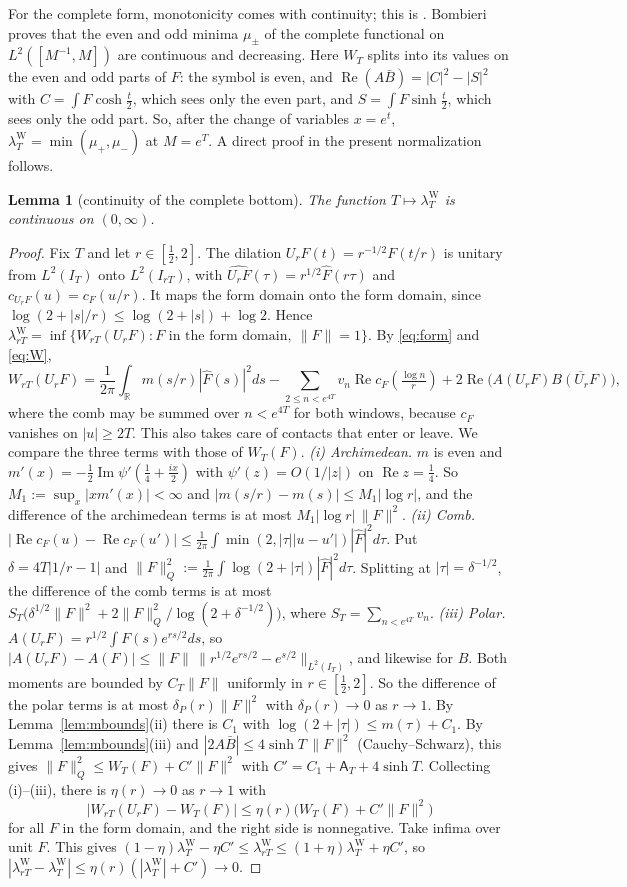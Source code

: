 \documentclass[11pt]{amsart}
\newtheorem{lemma}[theorem]{Lemma}
\theoremstyle{definition}
\theoremstyle{remark}
\newcommand{\R}{\mathbb R}
\newcommand{\Rel}{\operatorname{Re}}
\newcommand{\Iml}{\operatorname{Im}}
\newcommand{\IT}{I_T}
\newcommand{\lamW}{\lambda^{\mathrm W}_T}
\newcommand{\Fh}{\widehat F}
\newcommand{\cF}{c_F}
\newcommand{\Aconst}{\mathsf A_T}
\begin{document}
For the complete form, monotonicity comes with continuity; this is \cite[Thm.~5]{Bombieri2000}.
Bombieri proves that the even and odd minima $\mu_\pm$ of the complete functional
on $L^2([M^{-1},M])$ are continuous and decreasing. Here $W_T$ splits into its values on the even and
odd parts of $F$: the symbol is even, and $\Rel(A\bar B)=|C|^2-|S|^2$ with $C=\int F\cosh\frac t2$, which
sees only the even part, and $S=\int F\sinh\frac t2$, which sees only the odd part. So, after the change of
variables $x=e^t$, $\lamW=\min(\mu_+,\mu_-)$ at $M=e^T$. A direct proof in the present normalization follows.

\begin{lemma}[continuity of the complete bottom]\label{lem:contT}
The function $T\mapsto\lamW$ is continuous on $(0,\infty)$.
\end{lemma}
\begin{proof}
Fix $T$ and let $r\in[\frac12,2]$. The dilation $U_rF(t)=r^{-1/2}F(t/r)$ is unitary from $L^2(\IT)$ onto
$L^2(I_{rT})$, with $\widehat{U_rF}(\tau)=r^{1/2}\Fh(r\tau)$ and $c_{U_rF}(u)=\cF(u/r)$. It maps the form
domain onto the form domain, since $\log(2+|s|/r)\le\log(2+|s|)+\log2$. Hence
$\lambda^{\mathrm W}_{rT}=\inf\{W_{rT}(U_rF):F\text{ in the form domain},\ \|F\|=1\}$. By \eqref{eq:form}
and \eqref{eq:W},
\[
W_{rT}(U_rF)=\frac1{2\pi}\int_\R m(s/r)|\Fh(s)|^2ds-\sum_{2\le n<e^{4T}}v_n\Rel\cF(\tfrac{\log n}r)
+2\Rel\big(A(U_rF)\overline{B(U_rF)}\big),
\]
where the comb may be summed over $n<e^{4T}$ for both windows, because $\cF$ vanishes on $|u|\ge2T$. This
also takes care of contacts that enter or leave. We compare the three terms with those of $W_T(F)$.
\emph{(i) Archimedean.} $m$ is even and $m'(x)=-\frac12\Iml\psi'(\frac14+\frac{ix}2)$ with
$\psi'(z)=O(1/|z|)$ on $\Rel z=\frac14$. So $M_1:=\sup_x|xm'(x)|<\infty$ and
$|m(s/r)-m(s)|\le M_1|\log r|$, and the difference of the archimedean terms is at most
$M_1|\log r|\,\|F\|^2$.
\emph{(ii) Comb.} $|\Rel\cF(u)-\Rel\cF(u')|\le\frac1{2\pi}\int\min(2,|\tau||u-u'|)|\Fh|^2d\tau$. Put
$\delta=4T|1/r-1|$ and $\|F\|_Q^2:=\frac1{2\pi}\int\log(2+|\tau|)|\Fh|^2d\tau$. Splitting at
$|\tau|=\delta^{-1/2}$, the difference of the comb terms is at most
$S_T\big(\delta^{1/2}\|F\|^2+2\|F\|_Q^2/\log(2+\delta^{-1/2})\big)$, where $S_T=\sum_{n<e^{4T}}v_n$.
\emph{(iii) Polar.} $A(U_rF)=r^{1/2}\int F(s)e^{rs/2}ds$, so
$|A(U_rF)-A(F)|\le\|F\|\,\|r^{1/2}e^{rs/2}-e^{s/2}\|_{L^2(\IT)}$, and likewise for $B$. Both moments are
bounded by $C_T\|F\|$ uniformly in $r\in[\frac12,2]$. So the difference of the polar terms is at most
$\delta_P(r)\|F\|^2$ with $\delta_P(r)\to0$ as $r\to1$.
By Lemma~\ref{lem:mbounds}(ii) there is $C_1$ with $\log(2+|\tau|)\le m(\tau)+C_1$. By
Lemma~\ref{lem:mbounds}(iii) and $|2A\bar B|\le4\sinh T\,\|F\|^2$ (Cauchy--Schwarz), this gives
$\|F\|_Q^2\le W_T(F)+C'\|F\|^2$ with $C'=C_1+\Aconst+4\sinh T$. Collecting (i)--(iii), there is
$\eta(r)\to0$ as $r\to1$ with
\[
|W_{rT}(U_rF)-W_T(F)|\le\eta(r)\big(W_T(F)+C'\|F\|^2\big)
\]
for all $F$ in the form domain, and the right side is nonnegative. Take infima over unit $F$. This gives
$(1-\eta)\lamW-\eta C'\le\lambda^{\mathrm W}_{rT}\le(1+\eta)\lamW+\eta C'$, so
$|\lambda^{\mathrm W}_{rT}-\lamW|\le\eta(r)(|\lamW|+C')\to0$.
\end{proof}
\end{document}

